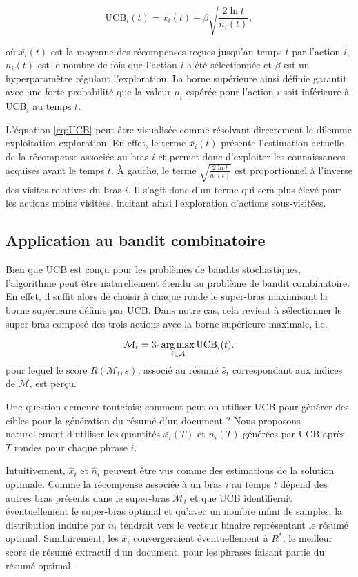 \begin{equation}
    \text{UCB}_i(t) = \bar{x_i}(t) + \beta \sqrt{\frac{2\ln t}{n_i(t)}},
    \label{eq:UCB}
\end{equation}

où $\bar{x_i}(t)$ est la moyenne des récompenses reçues jusqu'au temps $t$ par l'action $i$,
$n_i(t)$ est le nombre de fois que l'action $i$ a été sélectionnée et $\beta$ est un
hyperparamètre régulant l'exploration.
La borne supérieure ainsi définie garantit avec une forte probabilité que la valeur $\mu_i$ espérée
pour l'action $i$ soit inférieure à UCB$_i$ au temps $t$.

L'équation \eqref{eq:UCB} peut être visualisée comme résolvant directement le dilemme
exploitation-exploration.
En effet, le terme $\bar{x_i}(t)$ présente l'estimation actuelle de la récompense
associée au bras $i$ et permet donc d'exploiter les connaissances acquises
avant le temps $t$.
À gauche, le terme $\sqrt{\frac{2 \ln t}{n_i(t)}}$ est proportionnel à l'inverse
des visites relatives du bras $i$.
Il s'agit donc d'un terme qui sera plus élevé pour les actions moins visitées,
incitant ainsi l'exploration d'actions sous-visitées.

\subsection{Application au bandit combinatoire}

Bien que UCB est conçu pour les problèmes de bandits stochastiques, l'algorithme peut être 
naturellement étendu au problème de bandit combinatoire.
En effet, il suffit alors de choisir à chaque ronde le super-bras maximisant
la borne supérieure définie par UCB.
Dans notre cas, cela revient à sélectionner le super-bras composé des trois actions
avec la borne supérieure maximale, i.e.

\begin{equation*}
    \mathcal{M}_t = \text{3-}\operatorname*{arg\,max}_{i \in \mathcal{A}} \text{UCB}_i(t).
\end{equation*}
pour lequel le score $R(\mathcal{M}_t, s)$, associé au résumé $\hat{s}_t$ correspondant aux indices de $\mathcal{M}$,
est perçu.

Une question demeure toutefois: comment peut-on utiliser UCB pour générer des cibles 
pour la génération du résumé d'un document ?
Nous proposons naturellement d'utiliser les quantités $\bar{x_i}(T)$ et $n_i(T)$ 
générées par UCB après $T$ rondes pour chaque phrase $i$.

Intuitivement, $\hat{x}_i$ et $\hat{n}_i$ peuvent être vus comme des estimations 
de la solution optimale.
Comme la récompense associée à un bras $i$ au temps $t$ dépend des autres bras présents dans
le super-bras $\mathcal{M}_t$ et que UCB identifierait éventuellement le super-bras optimal
et qu'avec un nombre infini de samples, la distribution induite par $\hat{n}_i$ tendrait
vers le vecteur binaire représentant le résumé optimal.
Similairement, les $\hat{x}_i$ convergeraient éventuellement à $R^*$, le meilleur score de 
résumé extractif d'un document, pour les phrases faisant partie du résumé optimal.

